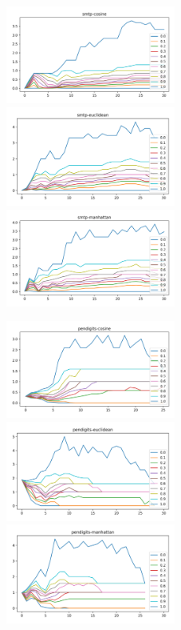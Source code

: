 \begin{figure}[!t]
\includegraphics[width=2.2in]{kdd/static/lfd_vs_depth/smtp-cosine.png}
\includegraphics[width=2.2in]{kdd/static/lfd_vs_depth/smtp-euclidean.png}
\includegraphics[width=2.2in]{kdd/static/lfd_vs_depth/smtp-manhattan.png}

\includegraphics[width=2.2in]{kdd/static/lfd_vs_depth/pendigits-cosine.png}
\includegraphics[width=2.2in]{kdd/static/lfd_vs_depth/pendigits-euclidean.png}
\includegraphics[width=2.2in]{kdd/static/lfd_vs_depth/pendigits-manhattan.png}


\end{figure}
